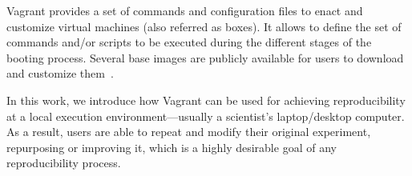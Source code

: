 Vagrant provides a set of commands and configuration files to enact and customize virtual machines
 (also referred as boxes). It allows to define the set of commands and/or scripts to be executed during 
 the different stages of the booting process. Several base images are publicly available for users to 
 download and customize them~\cite{vagrantbox}. 
 
In this work, we introduce how Vagrant can be used for achieving reproducibility at a local execution
environment---usually a scientist's laptop/desktop computer. As a result, users are able to repeat and 
modify their original experiment, repurposing or improving it, which is a highly desirable goal of any 
reproducibility process.

